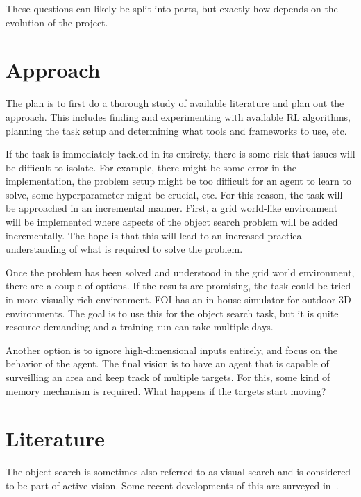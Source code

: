 \documentclass{article}
\begin{document}
These questions can likely be split into parts, but exactly how depends on the evolution of the project.

\section{Approach}

The plan is to first do a thorough study of available literature and plan out the approach. This includes finding and experimenting with available RL algorithms, planning the task setup and determining what tools and frameworks to use, etc.

If the task is immediately tackled in its entirety, there is some risk that issues will be difficult to isolate. For example, there might be some error in the implementation, the problem setup might be too difficult for an agent to learn to solve, some hyperparameter might be crucial, etc. For this reason, the task will be approached in an incremental manner. First, a grid world-like environment will be implemented where aspects of the object search problem will be added incrementally. The hope is that this will lead to an increased practical understanding of what is required to solve the problem.

Once the problem has been solved and understood in the grid world environment, there are a couple of options. If the results are promising, the task could be tried in more visually-rich environment. FOI has an in-house simulator for outdoor 3D environments. The goal is to use this for the object search task, but it is quite resource demanding and a training run can take multiple days. 

Another option is to ignore high-dimensional inputs entirely, and focus on the behavior of the agent. The final vision is to have an agent that is capable of surveilling an area and keep track of multiple targets. For this, some kind of memory mechanism is required. What happens if the targets start moving?

\section{Literature}

The object search is sometimes also referred to as visual search and is considered to be part of active vision. Some recent developments of this are surveyed in~\cite{chen2011}.
\end{document}
